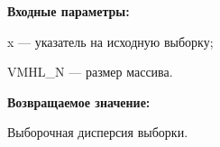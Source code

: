 \textbf{Входные параметры:}
 
x --- указатель на исходную выборку;
 
VMHL\_N --- размер массива.

\textbf{Возвращаемое значение:}
 
Выборочная дисперсия выборки.